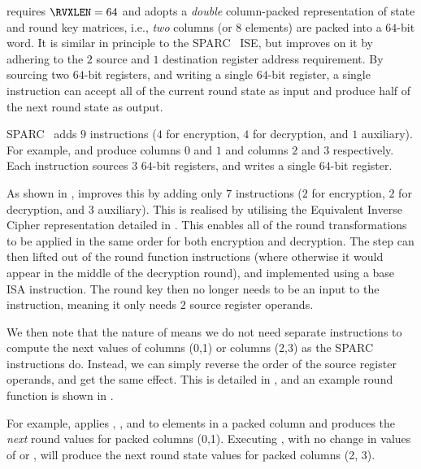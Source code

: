 
 requires $\RVXLEN = 64$
and adopts a {\em double} column-packed 
representation of state and round key matrices,
i.e., {\em two} columns (or $8$ elements) are packed into a $64$-bit word.
It is similar in principle to the SPARC~\cite[Page 109]{SPARC:16} ISE,
but improves on it by adhering to the
$2$ source and $1$ destination register address requirement.
By sourcing two $64$-bit registers, and writing a single $64$-bit register,
a single instruction can 
accept  all  of the current round state as  input
and
produce half of the next    round state as output.

SPARC~\cite[Page 109]{SPARC:16} adds $ 9$
instructions ($4$ for encryption, $4$ for decryption, and $1$ auxiliary).
For example,  and 
produce columns $0$ and $1$ and columns $2$ and $3$
respectively.
Each instruction sources $3$ $64$-bit registers, and writes a single
$64$-bit register.

As shown in ,  improves this by 
adding only $ 7$
instructions ($2$ for encryption, $2$ for decryption, and $3$ auxiliary).
This is realised by utilising the Equivalent Inverse Cipher representation
detailed in \cite[Section 5.3.5]{FIPS:197}.
This enables all of the round transformations to be applied in the same
order for both encryption and decryption.
The  step can then lifted out of the
round function instructions (where otherwise it would appear in the middle of
the decryption round), and implemented using a base ISA 
instruction.
The round key then no longer needs to be an input to the instruction,
meaning it only needs $2$ source register operands.

We then note that the nature of  means we do
not need separate instructions to compute the next values of
columns (0,1) or columns (2,3) as the SPARC instructions do.
Instead, we can simply reverse the order of the source register
operands, and get the same effect.
This is detailed in , and an example round
function is shown in .

For example,
applies
, , and   
to elements in a packed column and
produces the {\em next} round values for packed columns (0,1).
Executing
, with no change in values of
 or , will produce the next round state values for
packed columns (2, 3).

